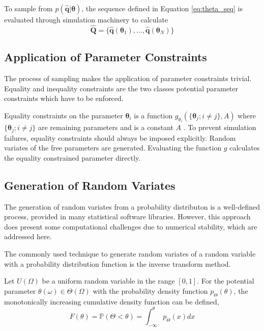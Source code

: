 To sample from $p(\hat{\bm{q}}|\bm{\theta})$, the sequence defined in Equation \ref{eq:theta_seq} is evaluated through simulation machinery to calculate
\begin{equation}
\label{eq:qoi_seq}
	\hat{\bm{Q}}= \{\hat{\bm{q}}(\bm{\theta}_1),...,\hat{\bm{q}}(\bm{\theta}_N)\}
\end{equation}

\subsection{Application of Parameter Constraints}

The process of sampling makes the application of parameter constraints trivial.  Equality and inequality constraints are the two classes potential parameter constraints which have to be enforced.

  Equality constraints on the parameter $\bm{\theta}_i$ is a function $g_{\theta_i}(\{\bm{\theta}_j; i \neq j\},A)$ where $\{\bm{\theta}_j; i \neq j\}$ are remaining parameters and is a constant $A$ .  To prevent simulation failures, equality constraints should always be imposed explicitly.  Random variates of the free parameters are generated.  Evaluating the function $g$ calculates the equality constrained parameter directly.

\subsection{Generation of Random Variates}

The generation of random variates from a probability distributon is a well-defined process, provided in many statistical software libraries.  However, this approach does present some computational challenges due to numerical stability, which are addressed here.

The commonly used technique to generate random variates of a random variable with a probability distribution function is the inverse transform method.

Let $U(\Omega)$ be a uniform random variable in the range $[0,1]$.  For the potential parameter $\theta(\omega) \in \Theta(\Omega)$ with the probability density function $p_\Theta(\theta)$, the monotonically increasing cumulative density function can be defined,
\begin{equation}
	  F(\theta) = \mathbb{P}(\Theta < \theta) = \int_{-\infty}^\theta p_\Theta(x) dx
\end{equation}

